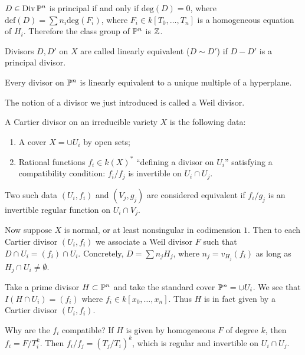 \documentclass[twoside, 10pt]{article}
\begin{document}
        \begin{cor}
            $D \in \operatorname{Div}\P^n$ is principal if and only if $\mathrm{deg}(D) = 0$, where $\mathrm{def}(D) = \sum n_i \mathrm{deg}(F_i)$, where $F_i \in k[T_0, \ldots, T_n]$ is a homogeneous equation of $H_i$. Therefore the class group of $\P^n$ is $\Z$.
        \end{cor}

        \begin{defn}
            Divisors $D,D'$ on $X$ are called linearly equivalent ($D \sim D'$) if $D-D'$ is a principal divisor.
        \end{defn}

        \begin{rmk}
            Every divisor on $\P^n$ is linearly equivalent to a unique multiple of a hyperplane.
        \end{rmk}

        The notion of a divisor we just introduced is called a Weil divisor.

        \begin{defn}
            A Cartier divisor on an irreducible variety $X$ is the following data:
            \begin{enumerate}
                \item A cover $X = \cup U_i$ by open sets;
                \item Rational functions $f_i \in k(X)^*$ ``defining a divisor on $U_i$'' satisfying a compatibility condition: $f_i/f_j$ is invertible on $U_i \cap U_j$.
            \end{enumerate}
            Two such data $(U_i,f_i)$ and $(V_j,g_j)$ are considered equivalent if $f_i/g_j$ is an invertible regular function on $U_i \cap V_j$.
        \end{defn}

        Now suppose $X$ is normal, or at least nonsingular in codimension $1$. Then to each Cartier divisor $(U_i,f_i)$ we associate a Weil divisor $F$ such that $D \cap U_i = (f_i) \cap U_i$. Concretely, $D = \sum n_jH_j$, where $n_j = v_{H_j}(f_i)$ as long as $H_j \cap U_i \neq \emptyset$. 

        \begin{exm}
            Take a prime divisor $H \subset \P^n$ and take the standard cover $\P^n = \cup U_i$. We see that $I(H \cap U_i) = (f_i)$ where $f_i \in k[x_0, \ldots, x_n]$. Thus $H$ is in fact given by a Cartier divisor $(U_i, f_i)$.

            Why are the $f_i$ compatible? If $H$ is given by homogeneous $F$ of degree $k$, then $f_i = F/T_i^k$. Then $f_i/f_j = (T_j/T_i)^k$, which is regular and invertible on $U_i \cap U_j$. 
        \end{exm}
\end{document}
